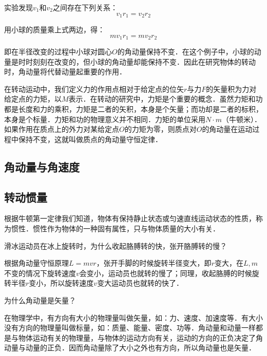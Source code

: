 实验发现$v_1$和$v_2$之间存在下列关系：
\begin{equation}
v_1r_1=v_2r_2
\end{equation}

用小球的质量乘上式两边，得：
\begin{equation}
mv_1r_1=mv_2r_2
\end{equation}

即在半径改变的过程中小球对圆心$O$的角动量保持不变．在这个例子中，小球的动量是时时刻刻在改变的，但小球的角动量却能保持不变．因此在研究物体的转动时，角动量将代替动量起重要的作用．

在转动运动中，我们定义力的作用点相对于给定点的位矢$r$与力$F$的矢量积为力对给定点的力矩，以$M$表示．在转动的研究中，力矩是个重要的概念．虽然力矩和功都是长度和力的乘积，力矩是二者的矢积，本身是个矢量；而功却是二者的标积，本身是个标量．力矩和功的物理意义并不相同．力矩的单位采用$N\cdot m$（牛顿米）．如果作用在质点上的外力对某给定点$O$的力矩为零，则质点对$O$的角动量在运动过程中保持不变，这就叫做质点的角动量守恒定律．
\subsection{角动量与角速度}

\subsection{转动惯量}
根据牛顿第一定律我们知道，物体有保持静止状态或匀速直线运动状态的性质，称为惯性．惯性作为物体的一种固有属性，只与物体质量的大小有关．
\begin{example}{}
滑冰运动员在冰上旋转时，为什么收起胳膊转的快，张开胳膊转的慢？

根据角动量守恒原理$L=mvr$，张开手脚的时候旋转半径变大，即$r$变大，在$L,m$不变的情况下旋转速度$v$会变小，运动员也就转的慢了；同理，收起胳膊的时候旋转半径$r$变小，所以旋转速度$v$变大运动员也就转的快了．
\end{example}
\begin{example}{}
为什么角动量是矢量？

在物理学中，有方向有大小的物理量叫做矢量，如：力、速度、加速度等．有大小没有方向的物理量叫做标量，如：质量、能量、密度、功等．角动量和动量一样都是与物体运动有关的物理量，与物体的运动方向有关，运动的方向的正负决定了角动量与动量的正负．因而角动量除了大小之外也有方向，所以角动量也是矢量．
\end{example}

